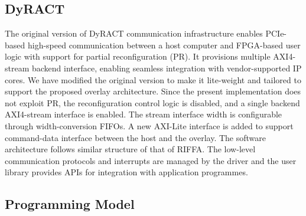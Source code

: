 \subsection{DyRACT}
The original version of DyRACT communication infrastructure enables PCIe-based high-speed communication between a host computer and FPGA-based user logic with support for partial reconfiguration (PR). 
It provisions multiple AXI4-stream backend interface, enabling seamless integration with vendor-supported IP cores. 
We have modified the original version to make it lite-weight and tailored to support the proposed overlay architecture. 
Since the present implementation does not exploit PR, the reconfiguration control logic is disabled, and a single backend AXI4-stream interface is enabled. 
The stream interface width is configurable through width-conversion FIFOs. 
A new AXI-Lite interface is added to support command-data interface between the host and the overlay.
The software architecture follows similar structure of that of RIFFA. 
The low-level communication protocols and interrupts are managed by the driver and the user library provides APIs for integration with application programmes. 

\subsection{Programming Model}
